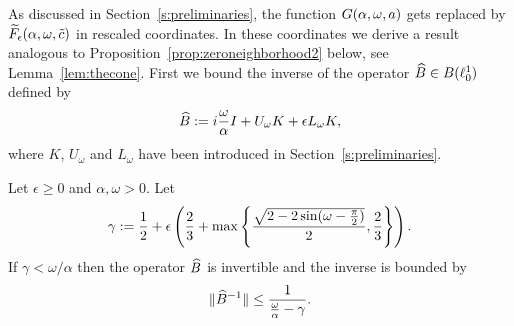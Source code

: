 As discussed in Section~\ref{s:preliminaries},
the function $G(\alpha,\omega,a)$ gets replaced by $\widetilde{F}_\epsilon(\alpha,\omega,\tilde{c})$ in rescaled coordinates. 
In these coordinates we derive a result analogous to Proposition~\ref{prop:zeroneighborhood2} below, see Lemma~\ref{lem:thecone}.
First we bound the inverse of the operator $\widehat{B} \in B(\ell^1_0)$ defined by
\[
  \widehat{B}:= i \frac{\omega}{\alpha} I +  U_{\omega} K +  \epsilon L_{\omega} K,
\]
where $K$, $U_{\omega}$ and $L_\omega$ have been introduced in Section~\ref{s:preliminaries}.
\begin{lemma}\label{lem:gamma}
	Let $\epsilon \geq 0$ and $\alpha,\omega>0$. Let
\[
  \gamma := 	  \frac{1}{2} +
  \epsilon \left( \frac{2}{3} + \max\left\{  \frac{\sqrt{2 - 2 \sin (\omega-\tfrac{\pi}{2}) }}{2} ,\frac{2}{3} \right\} \right).
\] 
If $\gamma < \omega / \alpha$ then the operator $\widehat{B}$ is invertible and the inverse is bounded by
\[
	  \| \widehat{B}^{-1} \| \leq \frac{1}{\frac{\omega}{\alpha}- \gamma}.
\]
\end{lemma} 

